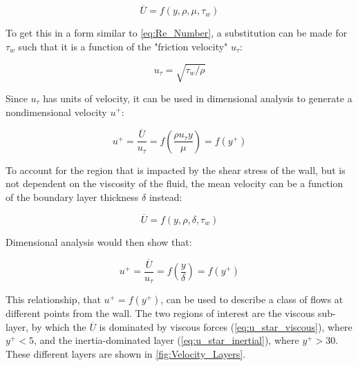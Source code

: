 \documentclass[double,12pt]{beavtex}
\begin{document}
\begin{equation}
    \overline{U} = f(y,\rho,\mu,\tau_{w})
\label{eq:Viscous_Mean_Velocity}
\end{equation}

To get this in a form similar to \ref{eq:Re_Number}, a substitution can be made for $\tau_{w}$ such that it is a function of the "friction velocity" $u_{\tau}$:

\begin{equation}
    u_{\tau} = \sqrt{\tau_{w}/\rho}
\label{eq:Mean_Velocity_Viscous}
\end{equation}

Since $u_{\tau}$ has units of velocity, it can be used in dimensional analysis to generate a nondimensional velocity $u^{+}$:

\begin{equation}
    u^{+} = \frac{\overline{U}}{u_{\tau}} = f \left (\frac{\rho u_{\tau} y}{\mu} \right ) = f(y^{+})
\label{eq:u_star_viscous}
\end{equation}

To account for the region that is impacted by the shear stress of the wall, but is not dependent on the viscosity of the fluid, the mean velocity can be a function of the boundary layer thickness $\delta$ instead:

\begin{equation}
    \overline{U} = f(y,\rho,\delta,\tau_{w})
\label{eq:Mean_Velocity_Inertial}
\end{equation}

Dimensional analysis would then show that:

\begin{equation}
    u^{+} = \frac{\overline{U}}{u_{\tau}} = f \left (\frac{y}{\delta} \right ) = f(y^{+})
\label{eq:u_star_inertial}
\end{equation}

This relationship, that $u^{+}=f(y^{+})$, can be used to describe a class of flows at different points from the wall. The two regions of interest are the viscous sub-layer, by which the $\overline{U}$ is dominated by viscous forces (\ref{eq:u_star_viscous}), where $y^{+}<5$, and the inertia-dominated layer (\ref{eq:u_star_inertial}), where $y^{+}>30$. These different layers are shown in \ref{fig:Velocity_Layers}. 
\end{document}

